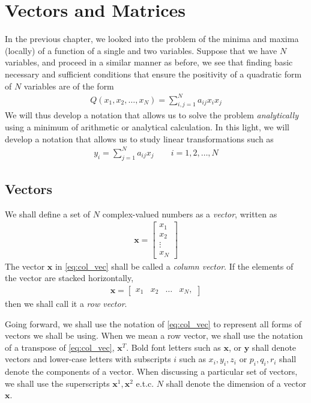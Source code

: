 \chapter{Vectors and Matrices}  
 \label{chap:vectors::intro}
 
 In the previous chapter, we looked into the problem of the minima and maxima (locally) of a function of a single and two variables. Suppose that we have $N$ variables, and proceed in a similar manner as before, we see that finding basic necessary and sufficient conditions that ensure the positivity of a quadratic form of $N$ variables are of the form
 \begin{align}
 	Q(x_1, x_2, \ldots, x_N) = \sum_{i,j=1}^{N} a_{ij} x_i x_j
 \end{align}
 We will thus develop a notation that allows us to solve the problem \textit{analytically} using a minimum of arithmetic or analytical calculation. In this light, we will develop a notation that allows us to study linear transformations such as
 \begin{align}
 	y_i = \sum_{j=1}^{N} a_{ij} x_j \qquad i=1,2, \ldots, N
 \end{align}
 
 \section{Vectors}
 
 We shall define a set of $N$ complex-valued numbers as a \textit{vector}, written as
 \begin{align}
 	\bm{x} = \begin{bmatrix}
 	x_1 \\ x_2 \\ \vdots \\ x_N
 	\end{bmatrix}
 	\label{eq:col_vec}
 \end{align}
 The vector $\bm{x}$ in \eqref{eq:col_vec} shall be called a \textit{column vector}. If the elements of the vector are stacked horizontally, \ie 
 \begin{align}
\bm{x} = \begin{bmatrix}
x_1 & x_2 & \ldots & x_N,
\end{bmatrix}
\label{eq:row_vec}
\end{align}
%
then we shall call it a \textit{row vector}.

Going forward, we shall use the notation of \eqref{eq:col_vec} to represent all forms of vectors we shall be using. When we mean a row vector, we shall use the notation of a transpose of \eqref{eq:col_vec}, \ie $\bm{x}^T$. Bold font letters such as $\bm{x}$, or  $\bm{y}$ shall denote vectors and lower-case letters with subscripts $i$ such as $x_i, y_i, z_i$ or $p_i, q_i, r_i$ shall denote the components of a vector. When discussing a particular set of vectors, we shall use the superscripts $\bm{x}^1, \bm{x}^2$ e.t.c. $N$ shall denote the dimension of a vector $\bm{x}$.

